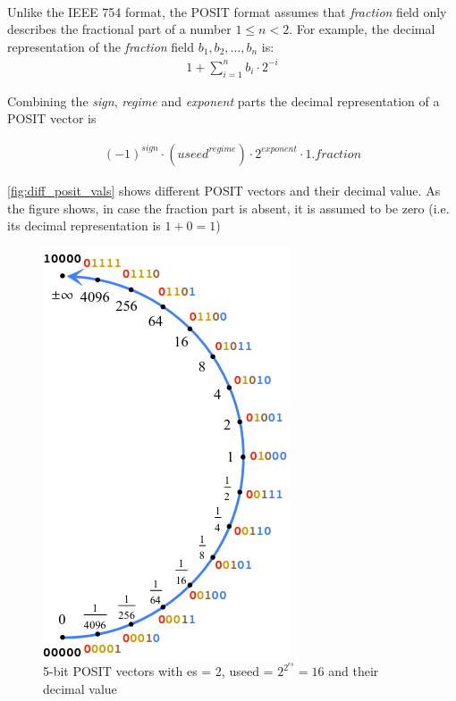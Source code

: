 \documentclass[10pt]{article}
\begin{document}
\paragraph{}
Unlike the IEEE 754 format, the POSIT format assumes that \textit{fraction} field only
describes the fractional part of a number $1\leq n < 2 $. For example, the
decimal representation of the \textit{fraction} field $b_{1},b_{2},\dots,b_{n}$
is:
\begin{align*}
 1 + \sum_{i=1}^{n}b_{i}\cdot 2^{-i}
\end{align*}

Combining the \textit{sign}, \textit{regime} and \textit{exponent} parts the
decimal representation of a POSIT vector is

\begin{align*}
{(-1)}^{sign} \cdot ({useed}^{regime}) \cdot {2}^{exponent} \cdot 1.fraction
\end{align*}

\autoref{fig:diff_posit_vals} shows different POSIT vectors and their decimal
value. As the figure shows, in case the fraction part is absent, it is assumed
to be zero (i.e. its decimal representation is $1 + 0 = 1$)

\begin{figure}[h]
  \centering
  \includegraphics[height=0.25\paperheight]{posit_values}
  \caption{5-bit POSIT vectors with es = 2, useed = $2^{2^{es}} = 16$ and their
    decimal value}
  \label{fig:diff_posit_vals}
\end{figure}
\end{document}
